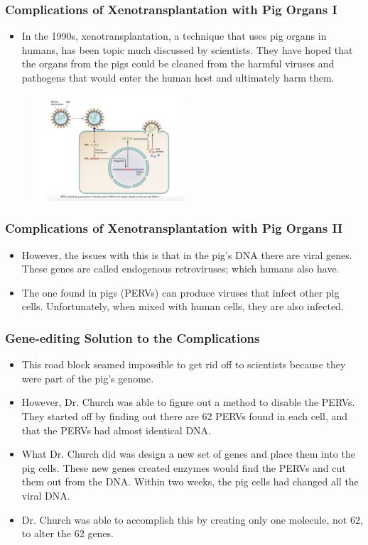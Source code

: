 \documentclass{beamer}
\begin{document}
\begin{frame}
\frametitle{Complications of Xenotransplantation with Pig Organs I}
\begin{itemize}
\item
In the 1990s, xenotransplantation, a technique that uses pig organs in humans, has been topic much discussed by scientists. They have hoped that the organs from the pigs could be cleaned from the harmful viruses and pathogens that would enter the human host and ultimately harm them. 
\end{itemize}
\begin{figure}[h!]
  \centering
    \includegraphics[width=0.5\textwidth]{lifecycle.png}
\end{figure}
\end{frame}

\begin{frame}
\frametitle{Complications of Xenotransplantation with Pig Organs II}
\begin{itemize}
\item
However, the issues with this is that in the pig’s DNA there are viral genes. These genes are called endogenous retroviruses; which humans also have. 
\item
The one found in pigs (PERVs) can produce viruses that infect other pig cells. Unfortunately, when mixed with human cells, they are also infected. 
\end{itemize}
\end{frame}


\begin{frame}
\frametitle{Gene-editing Solution to the Complications}
\begin{itemize}
\item
This road block seamed impossible to get rid off to scientists because they were part of the pig’s genome. 
\item
However, Dr. Church was able to figure out a method to disable the PERVs. They started off by finding out there are 62 PERVs found in each cell, and that the PERVs had almost identical DNA. 
\item
What Dr. Church did was design a new set of genes and place them into the pig cells. These new genes created enzymes would find the PERVs and cut them out from the DNA. Within two weeks, the pig cells had changed all the viral DNA. 
\item
Dr. Church was able to accomplish this by creating only one molecule, not 62, to alter the 62 genes.
\end{itemize}
\end{frame}
\end{document}
